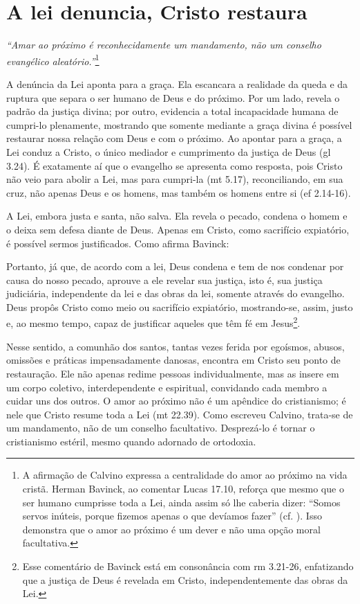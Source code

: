 \section{A lei denuncia, Cristo restaura}

\textit{``Amar ao próximo é reconhecidamente um mandamento, não um conselho evangélico aleatório.''}\footnote{A afirmação de Calvino expressa a centralidade do amor ao próximo na vida cristã. Herman Bavinck, ao comentar Lucas 17.10, reforça que mesmo que o ser humano cumprisse toda a Lei, ainda assim só lhe caberia dizer: ``Somos servos inúteis, porque fizemos apenas o que devíamos fazer'' (cf. \cite[p.~738]{bavinck2012}). Isso demonstra que o amor ao próximo é um dever e não uma opção moral facultativa.} \cite[p.~745]{calvino2022}

A denúncia da Lei aponta para a graça. Ela escancara a realidade da queda e da ruptura que separa o ser humano de Deus e do próximo. Por um lado, revela o padrão da justiça divina; por outro, evidencia a total incapacidade humana de cumpri-lo plenamente, mostrando que somente mediante a graça divina é possível restaurar nossa relação com Deus e com o próximo. Ao apontar para a graça, a Lei conduz a Cristo, o único mediador e cumprimento da justiça de Deus (\gls{gl} 3.24). É exatamente aí que o evangelho se apresenta como resposta, pois Cristo não veio para abolir a Lei, mas para cumpri-la (\gls{mt} 5.17), reconciliando, em sua cruz, não apenas Deus e os homens, mas também os homens entre si (\gls{ef} 2.14-16).

A Lei, embora justa e santa, não salva. Ela revela o pecado, condena o homem e o deixa sem defesa diante de Deus. Apenas em Cristo, como sacrifício expiatório, é possível sermos justificados. Como afirma Bavinck:

\begin{citacao}
    Portanto, já que, de acordo com a lei, Deus condena e tem de nos condenar por causa do nosso pecado, aprouve a ele revelar sua justiça, isto é, sua justiça judiciária, independente da lei e das obras da lei, somente através do evangelho. Deus propôs Cristo como meio ou sacrifício expiatório, mostrando-se, assim, justo e, ao mesmo tempo, capaz de justificar aqueles que têm fé em Jesus\footnote{Esse comentário de Bavinck está em consonância com \gls{rm} 3.21-26, enfatizando que a justiça de Deus é revelada em Cristo, independentemente das obras da Lei.}. \cite[p.~212]{bavinck2012}
\end{citacao}

Nesse sentido, a comunhão dos santos, tantas vezes ferida por egoísmos, abusos, omissões e práticas impensadamente danosas, encontra em Cristo seu ponto de restauração. Ele não apenas redime pessoas individualmente, mas as insere em um corpo coletivo, interdependente e espiritual, convidando cada membro a cuidar uns dos outros. O amor ao próximo não é um apêndice do cristianismo; é nele que Cristo resume toda a Lei (\gls{mt} 22.39). Como escreveu Calvino, trata-se de um mandamento, não de um conselho facultativo. Desprezá-lo é tornar o cristianismo estéril, mesmo quando adornado de ortodoxia.

